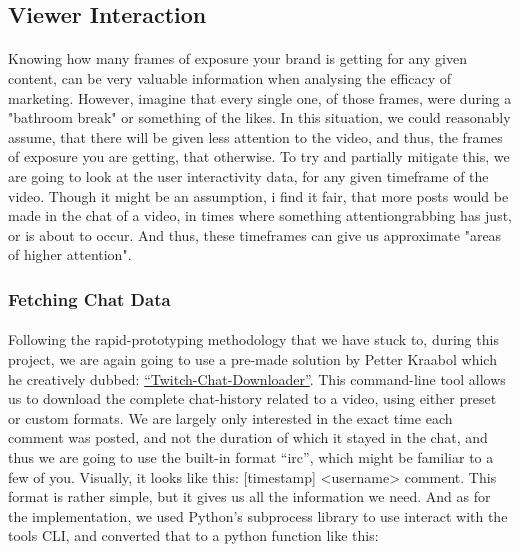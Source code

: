 \documentclass{article}
\begin{document}
\subsection{Viewer Interaction}
\paragraph{}
Knowing how many frames of exposure your brand is
getting for any given content, can be very valuable
information when analysing the efficacy of marketing. However,
imagine that every single one, of those frames, were during a "bathroom break"
or something of the likes. In this situation, we could reasonably assume, that
there will be given less attention to the video, and thus, the frames of exposure you are getting,
that otherwise.
\newline\newline
To try and partially mitigate this, we are going to look at the
user interactivity data, for any given timeframe of the video. Though it might be an assumption,
i find it fair, that more posts would be made in the chat of a video, in times where something attentiongrabbing has just, or is about to occur.
And thus, these timeframes can give us approximate "areas of higher attention".


\subsubsection{Fetching Chat Data}
\paragraph{}
Following the rapid-prototyping methodology
that we have stuck to, during this project, we are again going
to use a pre-made solution by Petter Kraabol which he creatively
dubbed: \href{https://github.com/PetterKraabol/Twitch-Chat-Downloader}{“Twitch-Chat-Downloader”}.  
\newline\newline
This command-line tool allows us to download the complete
chat-history related to a video, using
either preset or custom formats.  We are largely only interested
in the exact time each comment was posted, and not the duration of
which it stayed in the chat, and thus we are going to use the built-in
format “irc”, which might be familiar to a few of you. 
\newline\newline
Visually, it looks like this:  [timestamp] <username> comment. 
This format is rather simple, but it gives us all the information
we need. And as for the implementation, we used Python's subprocess
library to use interact with the tools CLI, and converted that to a python function like this:
\end{document}
